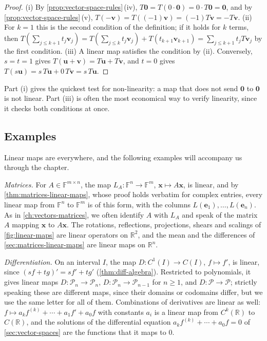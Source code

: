 \begin{proof}
(i) By \cref{prop:vector-space-rules}\,(iv), $T\mathbf 0=T(0\cdot\mathbf 0)=0\cdot T\mathbf 0=\mathbf 0$, and by \cref{prop:vector-space-rules}\,(v), $T(-\mathbf v)=T((-1)\mathbf v)=(-1)T\mathbf v=-T\mathbf v$. (ii) For $k=1$ this is the second condition of the definition; if it holds for $k$ terms, then $T(\sum_{j\le k+1}t_j\mathbf v_j)=T(\sum_{j\le k}t_j\mathbf v_j)+T(t_{k+1}\mathbf v_{k+1})=\sum_{j\le k+1}t_jT\mathbf v_j$ by the first condition. (iii) A linear map satisfies the condition by (ii). Conversely, $s=t=1$ gives $T(\mathbf u+\mathbf v)=T\mathbf u+T\mathbf v$, and $t=0$ gives $T(s\mathbf u)=s\,T\mathbf u+0\,T\mathbf v=s\,T\mathbf u$.
\end{proof}

Part (i) gives the quickest test for non-linearity: a map that does not send $\mathbf 0$ to $\mathbf 0$ is not linear. Part (iii) is often the most economical way to verify linearity, since it checks both conditions at once.

\subsection{Examples}

Linear maps are everywhere, and the following examples will accompany us through the chapter.

\emph{Matrices.} For $A\in\mathbb F^{m\times n}$, the map $L_A\colon\mathbb F^n\to\mathbb F^m$, $\mathbf x\mapsto A\mathbf x$, is linear, and by \cref{thm:matrices-linear-maps}, whose proof holds verbatim for complex entries, every linear map from $\mathbb F^n$ to $\mathbb F^m$ is of this form, with the columns $L(\mathbf e_1),\ldots,L(\mathbf e_n)$. As in \cref{ch:vectors-matrices}, we often identify $A$ with $L_A$ and speak of the matrix $A$ mapping $\mathbf x$ to $A\mathbf x$. The rotations, reflections, projections, shears and scalings of \cref{fig:linear-maps} are linear operators on $\mathbb R^2$, and the mean and the differences of \cref{sec:matrices-linear-maps} are linear maps on $\mathbb R^n$.

\emph{Differentiation.} On an interval $I$, the map $D\colon C^1(I)\to C(I)$, $f\mapsto f'$, is linear, since $(sf+tg)'=sf'+tg'$ (\cref{thm:diff-algebra}). Restricted to polynomials, it gives linear maps $D\colon\mathcal P_n\to\mathcal P_n$, $D\colon\mathcal P_n\to\mathcal P_{n-1}$ for $n\ge1$, and $D\colon\mathcal P\to\mathcal P$; strictly speaking these are different maps, since their domains or codomains differ, but we use the same letter for all of them. Combinations of derivatives are linear as well: $f\mapsto a_kf^{(k)}+\cdots+a_1f'+a_0f$ with constants $a_i$ is a linear map from $C^k(\mathbb R)$ to $C(\mathbb R)$, and the solutions of the differential equation $a_kf^{(k)}+\cdots+a_0f=0$ of \cref{sec:vector-spaces} are the functions that it maps to $0$.

